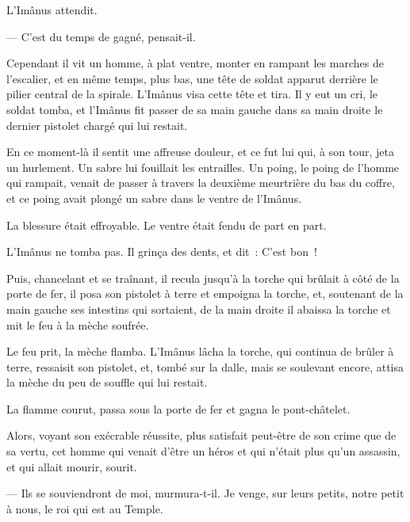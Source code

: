 \documentclass[french,twoside]{book} %
\begin{document}
L’Imânus attendit.\par
— C’est du temps de gagné, pensait-il.\par
Cependant il vit un homme, à plat ventre, monter en rampant les marches de l’escalier, et en même temps, plus bas, une tête de soldat apparut derrière le pilier central de la spirale. L’Imânus visa cette tête et tira. Il y eut un cri, le soldat tomba, et l’Imânus fit passer de sa main gauche dans sa main droite le dernier pistolet chargé qui lui restait.\par
En ce moment-là il sentit une affreuse douleur, et  ce fut lui qui, à son tour, jeta un hurlement. Un sabre lui fouillait les entrailles. Un poing, le poing de l’homme qui rampait, venait de passer à travers la deuxième meurtrière du bas du coffre, et ce poing avait plongé un sabre dans le ventre de l’Imânus.\par
La blessure était effroyable. Le ventre était fendu de part en part.\par
L’Imânus ne tomba pas. Il grinça des dents, et dit : C’est bon !\par
Puis, chancelant et se traînant, il recula jusqu’à la torche qui brûlait à côté de la porte de fer, il posa son pistolet à terre et empoigna la torche, et, soutenant de la main gauche ses intestins qui sortaient, de la main droite il abaissa la torche et mit le feu à la mèche soufrée.\par
Le feu prit, la mèche flamba. L’Imânus lâcha la torche, qui continua de brûler à terre, ressaisit son pistolet, et, tombé sur la dalle, mais se soulevant encore, attisa la mèche du peu de souffle qui lui restait.\par
La flamme courut, passa sous la porte de fer et gagna le pont-châtelet.\par
Alors, voyant son exécrable réussite, plus satisfait peut-être de son crime que de sa vertu, cet homme qui venait d’être un héros et qui n’était plus qu’un assassin, et qui allait mourir, sourit.\par
— Ils se souviendront de moi, murmura-t-il. Je venge, sur leurs petits, notre petit à nous, le roi qui est au Temple.
\end{document}
